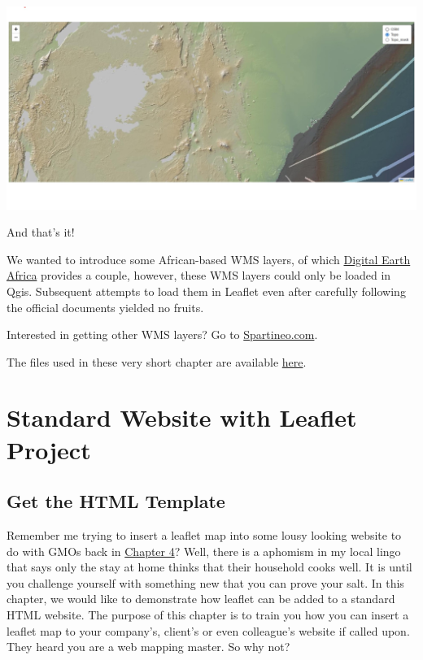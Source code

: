 \documentclass[
]{book}
\begin{document}
\includegraphics[width=26.67in]{../images/wms_layer}

And that's it!

We wanted to introduce some African-based WMS layers, of which \href{https://training.digitalearthafrica.org/en/latest/OWS_tutorial.html}{Digital Earth Africa} provides a couple, however, these WMS layers could only be loaded in Qgis. Subsequent attempts to load them in Leaflet even after carefully following the official documents yielded no fruits.

Interested in getting other WMS layers? Go to \href{https://directory.spatineo.com/}{Spartineo.com}.

The files used in these very short chapter are available \href{https://www.dropbox.com/scl/fo/n6oiyw21axiqxpdcfeqnp/h?dl=0\&rlkey=jr8f6g5mx5i83kpjofv56hk5g}{here}.

\hypertarget{standard-website-with-leaflet-project}{%
\chapter{Standard Website with Leaflet Project}\label{standard-website-with-leaflet-project}}

\hypertarget{get-the-html-template}{%
\section{Get the HTML Template}\label{get-the-html-template}}

Remember me trying to insert a leaflet map into some lousy looking website to do with GMOs back in \protect\hyperlink{embedding-leaflet-map-to-an-external-website}{Chapter 4}? Well, there is a aphomism in my local lingo that says only the stay at home thinks that their household cooks well. It is until you challenge yourself with something new that you can prove your salt. In this chapter, we would like to demonstrate how leaflet can be added to a standard HTML website. The purpose of this chapter is to train you how you can insert a leaflet map to your company's, client's or even colleague's website if called upon. They heard you are a web mapping master. So why not?
\end{document}
